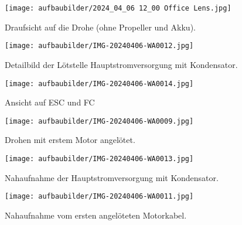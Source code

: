 \begin{figure}[htbp]
	\centering
	\begin{minipage}[b]{0.3\textwidth}
		\centering
		\texttt{[image: aufbaubilder/2024\_04\_06 12\_00 Office Lens.jpg]}
		\caption{Draufsicht auf die Drohe (ohne Propeller und Akku).}
		\label{fig:aufbau1}
	\end{minipage}%
	\hfill
	\begin{minipage}[b]{0.3\textwidth}
		\centering
		\texttt{[image: aufbaubilder/IMG-20240406-WA0012.jpg]}
		\caption{Detailbild der Lötstelle Hauptstromversorgung mit Kondensator.}
		\label{fig:aufbau2}
	\end{minipage}%
	\hfill
	\begin{minipage}[b]{0.3\textwidth}
		\centering
		\texttt{[image: aufbaubilder/IMG-20240406-WA0014.jpg]}
		\caption{Ansicht auf ESC und FC}
		\label{fig:aufbau3}
	\end{minipage}

	\vskip 0.5cm %
\end{figure}
\begin{figure}[htbp]	
	\begin{minipage}[b]{0.3\textwidth}
		\centering
		\texttt{[image: aufbaubilder/IMG-20240406-WA0009.jpg]}
		\caption{Drohen mit erstem Motor angelötet.}
		\label{fig:aufbau4}
	\end{minipage}%
	\hfill
	\begin{minipage}[b]{0.3\textwidth}
		\centering
		\texttt{[image: aufbaubilder/IMG-20240406-WA0013.jpg]}
		\caption{Nahaufnahme der Hauptstromversorgung mit Kondensator.}
		\label{fig:aufbau5}
	\end{minipage}%
	\hfill
	\begin{minipage}[b]{0.3\textwidth}
		\centering
		\texttt{[image: aufbaubilder/IMG-20240406-WA0011.jpg]}
		\caption{Nahaufnahme vom ersten angelöteten Motorkabel.}
		\label{fig:aufbau6}
	\end{minipage}
	
	\vskip 0.5cm %
\end{figure}
